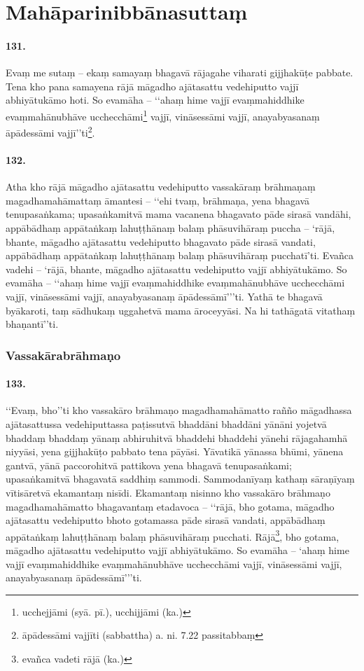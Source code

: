 \section{Mahāparinibbānasuttaṃ}

\paragraph{131.} Evaṃ me sutaṃ – ekaṃ samayaṃ bhagavā rājagahe viharati gijjhakūṭe pabbate. Tena kho pana samayena rājā māgadho ajātasattu vedehiputto vajjī abhiyātukāmo hoti. So evamāha – ‘‘ahaṃ hime vajjī evaṃmahiddhike evaṃmahānubhāve ucchecchāmi\footnote{ucchejjāmi (syā. pī.), ucchijjāmi (ka.)} vajjī, vināsessāmi vajjī, anayabyasanaṃ āpādessāmi vajjī’’ti\footnote{āpādessāmi vajjīti (sabbattha) a. ni. 7.22 passitabbaṃ}.

\paragraph{132.} Atha kho rājā māgadho ajātasattu vedehiputto vassakāraṃ brāhmaṇaṃ magadhamahāmattaṃ āmantesi – ‘‘ehi tvaṃ, brāhmaṇa, yena bhagavā tenupasaṅkama; upasaṅkamitvā mama vacanena bhagavato pāde sirasā vandāhi, appābādhaṃ appātaṅkaṃ lahuṭṭhānaṃ balaṃ phāsuvihāraṃ puccha – ‘rājā, bhante, māgadho ajātasattu vedehiputto bhagavato pāde sirasā vandati, appābādhaṃ appātaṅkaṃ lahuṭṭhānaṃ balaṃ phāsuvihāraṃ pucchatī’ti. Evañca vadehi – ‘rājā, bhante, māgadho ajātasattu vedehiputto vajjī abhiyātukāmo. So evamāha – ‘‘ahaṃ hime vajjī evaṃmahiddhike evaṃmahānubhāve ucchecchāmi vajjī, vināsessāmi vajjī, anayabyasanaṃ āpādessāmī’’’ti. Yathā te bhagavā byākaroti, taṃ sādhukaṃ uggahetvā mama āroceyyāsi. Na hi tathāgatā vitathaṃ bhaṇantī’’ti.

\subsubsection{Vassakārabrāhmaṇo}

\paragraph{133.} ‘‘Evaṃ, bho’’ti kho vassakāro brāhmaṇo magadhamahāmatto rañño māgadhassa ajātasattussa vedehiputtassa paṭissutvā bhaddāni bhaddāni yānāni yojetvā bhaddaṃ bhaddaṃ yānaṃ abhiruhitvā bhaddehi bhaddehi yānehi rājagahamhā niyyāsi, yena gijjhakūṭo pabbato tena pāyāsi. Yāvatikā yānassa bhūmi, yānena gantvā, yānā paccorohitvā pattikova yena bhagavā tenupasaṅkami; upasaṅkamitvā bhagavatā saddhiṃ sammodi. Sammodanīyaṃ kathaṃ sāraṇīyaṃ vītisāretvā ekamantaṃ nisīdi. Ekamantaṃ nisinno kho vassakāro brāhmaṇo magadhamahāmatto bhagavantaṃ etadavoca – ‘‘rājā, bho gotama, māgadho ajātasattu vedehiputto bhoto gotamassa pāde sirasā vandati, appābādhaṃ appātaṅkaṃ lahuṭṭhānaṃ balaṃ phāsuvihāraṃ pucchati. Rājā\footnote{evañca vadeti rājā (ka.)}, bho gotama, māgadho ajātasattu vedehiputto vajjī abhiyātukāmo. So evamāha – ‘ahaṃ hime vajjī evaṃmahiddhike evaṃmahānubhāve ucchecchāmi vajjī, vināsessāmi vajjī, anayabyasanaṃ āpādessāmī’’’ti.

